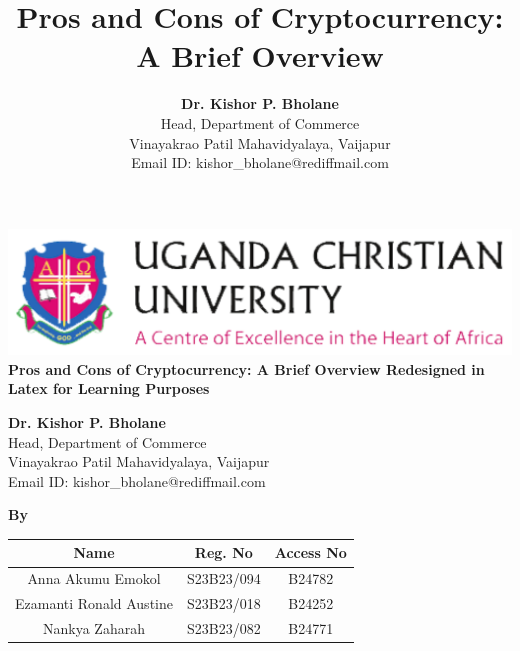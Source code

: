 \documentclass[11pt]{article}
\begin{document}
\begin{titlepage}
    \centering
    \vspace*{1cm}
    \includegraphics[width=15cm]{img/UCU.png} \\[1.5cm] %
    \Huge
    \textbf{Pros and Cons of Cryptocurrency: A Brief Overview Redesigned in Latex for Learning Purposes}
    
    \vspace{0.5cm}
    \LARGE
    \textbf{Dr. Kishor P. Bholane} \\
    Head, Department of Commerce \\
    Vinayakrao Patil Mahavidyalaya, Vaijapur \\
    Email ID: kishor\_bholane@rediffmail.com
    
    \vspace{1cm}

    \textbf{By}
    
    \vspace{0.5cm}
    
    \begin{tabular}{|c|c|c|}
        \hline
        \textbf{Name} & \textbf{Reg. No} & \textbf{Access No} \\ \hline
        Anna Akumu Emokol & S23B23/094 & B24782 \\ \hline
        Ezamanti Ronald Austine & S23B23/018  & B24252 \\ \hline
        Nankya Zaharah & S23B23/082 & B24771 \\ \hline
    \end{tabular}
    
    \vfill
    
\end{titlepage}
\title{\textbf{Pros and Cons of Cryptocurrency: A Brief Overview}}
\author{\textbf{Dr. Kishor P. Bholane} \\ Head, Department of Commerce \\ Vinayakrao Patil Mahavidyalaya, Vaijapur \\ Email ID: kishor\_bholane@rediffmail.com}
\date{}
\maketitle
\thispagestyle{fancy}
\end{document}
